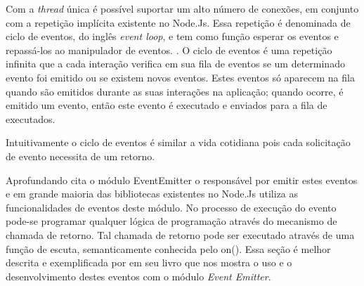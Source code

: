   Com a \textit{thread} única é possível suportar um alto número de conexões, em conjunto com a repetição implícita existente no Node.Js. 
  Essa repetição é denominada de ciclo de eventos, do inglês \textit{event loop}, e tem como função esperar os eventos e repassá-los 
  ao manipulador de eventos. \cite{Tilkov:2010}
  . 
  O ciclo de eventos é uma repetição infinita que a cada interação verifica em sua 
  fila de eventos se um determinado evento foi emitido ou se existem novos eventos. Estes eventos só aparecem na 
  fila quando são emitidos durante as suas interações na aplicação; quando ocorre, é emitido um evento, então este evento 
  é executado e enviados para a fila de executados.\cite{Pereira:2013}
  
  
   
  Intuitivamente o ciclo de eventos é similar a vida cotidiana pois cada solicitação de evento necessita de um retorno.
  
  
  Aprofundando  cita o módulo EventEmitter o responsável por emitir estes eventos e em 
  grande maioria das bibliotecas existentes no Node.Js utiliza as funcionalidades de eventos deste módulo. 
  No processo de execução do evento pode-se programar qualquer lógica de programação através do 
  mecanismo de chamada de retorno. Tal chamada de retorno pode ser executado através de uma função de escuta, 
  semanticamente conhecida pelo on(). Essa seção é melhor descrita e exemplificada por  
  em seu livro que nos mostra o uso e o desenvolvimento destes eventos com o módulo \textit{Event Emitter}.

